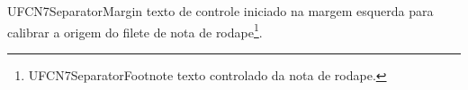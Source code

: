 \documentclass{abntexto-ufc}
\begin{document}
\textual

\noindent
UFCN7SeparatorMargin texto de controle iniciado na margem esquerda para calibrar a origem do filete de nota de rodape\footnote{UFCN7SeparatorFootnote texto controlado da nota de rodape.}.
\end{document}
